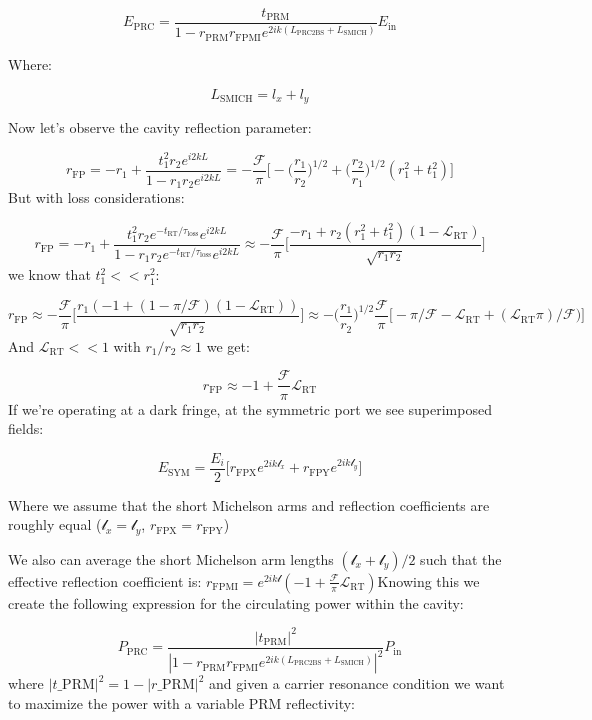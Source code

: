 \[ E_\mathrm{PRC} = \frac{t_\mathrm{PRM}}{1- r_\mathrm{PRM} r_\mathrm{FPMI} e^{2ik (L_\mathrm{PRC2BS} + L_\mathrm{SMICH})}}E_\mathrm{in} \]

Where:

\[ L_\mathrm{SMICH} = l_x + l_y \]

Now let's observe the cavity reflection parameter:

\[ r_\mathrm{FP} = -r_1 + \frac{t_1^2 r_2 e^{i2kL}}{1-r_1 r_2 e^{i2kL}} = -\frac{\mathcal{F}}{\pi} \Big[-\Big(\frac{r_1}{r_2} \Big)^{1/2} + \Big(\frac{r_2}{r_1}\Big)^{1/2} (r_1^2 + t_1^2) \Big]\]
But with loss considerations:

\[ r_\mathrm{FP} = -r_1 + \frac{t_1^2 r_2 e^{- t_\mathrm{RT}/\tau_\mathrm{loss}}  e^{i2kL}}{1-r_1 r_2 e^{- t_\mathrm{RT}/\tau_\mathrm{loss}} e^{i2kL}} \approx -\frac{\mathcal{F}}{\pi} \Big[\frac{-r_1 +  r_2(r_1^2 + t_1^2)(1-\mathscr{L}_\mathrm{RT})}{\sqrt{r_1 r_2}} \Big]\]
we know that \(t_1^2 << r_1^2\):

\[r_\mathrm{FP} \approx -\frac{\mathcal{F}}{\pi} \Big[ \frac{r_1(-1 + (1 - \pi/\mathcal{F}) (1- \mathscr{L}_\mathrm{RT}))}{\sqrt{r_1 r_2}} \Big] \approx  -\Big(\frac{r_1}{r_2}\Big)^{1/2} \frac{\mathcal{F}}{\pi} \Big[- \pi/\mathcal{F} - \mathscr{L}_\mathrm{RT} + (\mathscr{L}_\mathrm{RT}\pi)/\mathcal{F}) \Big] \]And
\(\mathscr{L}_\mathrm{RT} <<1\) with \(r_1 /r_2 \approx 1\) we get:

\[r_\mathrm{FP} \approx -1 + \frac{\mathcal{F}}{\pi} \mathscr{L}_\mathrm{RT}\]If
we're operating at a dark fringe, at the symmetric port we see
superimposed fields:

\[ E_\mathrm{SYM}  = \frac{E_i}{2} \Big[ r_\mathrm{FPX}e^{2ik\mathscr{l}_x} + r_\mathrm{FPY}e^{2ik\mathscr{l}_y} \Big] \]

Where we assume that the short Michelson arms and reflection
coefficients are roughly equal (\(\mathscr{l}_x = \mathscr{l}_y\),
\(r_\mathrm{FPX} = r_\mathrm{FPY}\))

We also can average the short Michelson arm lengths
\((\mathscr{l}_x + \mathscr{l}_y)/2\) such that the effective reflection
coefficient is:
\(r_\mathrm{FPMI} = e^{2ik\mathscr{l}}(- 1 + \frac{\mathcal{F}}{\pi} \mathscr{L}_\mathrm{RT})\)Knowing
this we create the following expression for the circulating power within
the cavity:

\[ P_\mathrm{PRC} = \frac{|t_\mathrm{PRM}| ^2}{|1-r_\mathrm{PRM} r_\mathrm{FPMI} e^{2ik(L_\mathrm{PRC2BS} + L_\mathrm{SMICH})}| ^2} P_\mathrm{in}\] where
$ | t\_\mathrm{PRM} | ^2 = 1 - | r\_\mathrm{PRM} | ^ 2 $ and given a carrier resonance
condition we want to maximize the power with a variable PRM
reflectivity:

